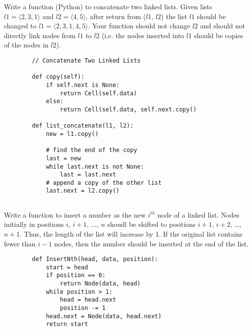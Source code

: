 \documentclass[11pt,addpoints]{exam}
\begin{document}
\begin{questions}
\question[10]
Write a function (Python) to concatenate two linked lists.  Given lists $l1 = \langle 2, 3, 1 \rangle$ and $l2 = \langle 4, 5 \rangle$, after return from ($l1$, $l2$) the list $l1$ should be changed to $l1 = \langle 2, 3, 1, 4, 5 \rangle$.  Your function should not change $l2$ and should not directly link nodes from $l1$ to $l2$ (i.e. the nodes inserted into $l1$ should be copies of the nodes in $l2$).

\begin{solutionorbox}
	\newline
	\begin{lstlisting}
		// Concatenate Two Linked Lists
		
		def copy(self):
			if self.next is None:
				return Cell(self.data)
			else:
				return Cell(self.data, self.next.copy()
		
		def list_concatenate(l1, l2):
			new = l1.copy()
		
			# find the end of the copy
			last = new
			while last.next is not None:
				last = last.next
			# append a copy of the other list
			last.next = l2.copy()
		
	\end{lstlisting}
\end{solutionorbox}

\ifprintanswers
\newpage
\else
\bigskip
\fi


\question[10]
Write a function to insert a number as the new $i^{th}$ node of a linked list.  Nodes initially in positions $i$, $i+1$, $\dots$, $n$ shoudl be shifted to positions $i+1$, $i+2$, \dots, $n+1$.  Thus, the length of the list will increase by 1.  If the original list contains fewer than $i-1$ nodes, then the number should be inserted at the end of the list.

\begin{solutionorbox}
	\begin{lstlisting}
		def InsertNth(head, data, position):
			start = head
			if position == 0:
				return Node(data, head)
			while position > 1:
				head = head.next
				position -= 1
			head.next = Node(data, head.next)
			return start
	\end{lstlisting}
\end{solutionorbox}


\end{questions}
\end{document}
